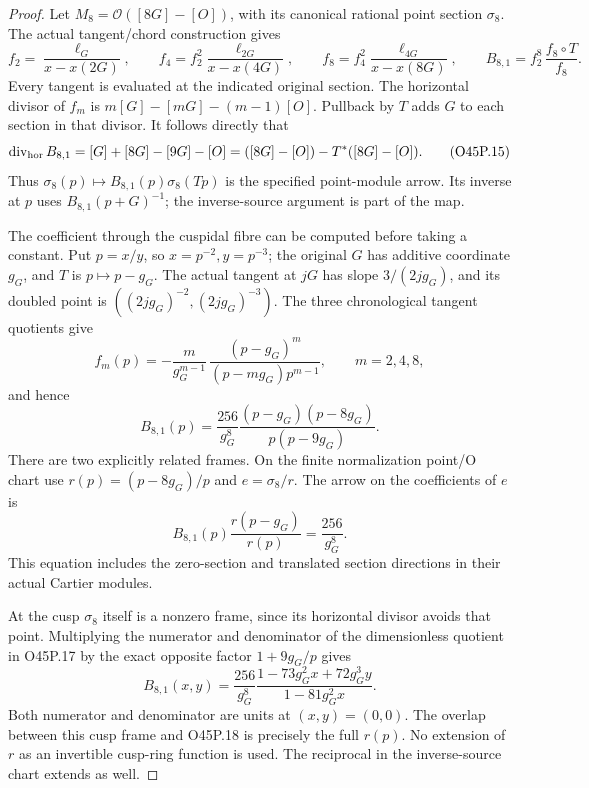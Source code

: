 \begin{proof}
\par\nobreak

Let \(M_8=\mathcal O([8G]-[O])\), with its canonical rational point
section \(\sigma_8\). The actual tangent/chord construction gives
\[
 f_2=\frac{\ell_G}{x-x(2G)},\qquad
 f_4=f_2^2\frac{\ell_{2G}}{x-x(4G)},\qquad
 f_8=f_4^2\frac{\ell_{4G}}{x-x(8G)},\qquad
 B_{8,1}=f_2^8\,\frac{f_8\circ T}{f_8}.
 \tag{O45P.14}
\]
Every tangent is evaluated at the indicated original section.
The horizontal divisor of \(f_m\) is
\(m[G]-[mG]-(m-1)[O]\). Pullback by \(T\) adds \(G\) to each
section in that divisor. It follows directly that
\[
 \operatorname{div}_{\rm hor}B_{8,1}
      =[G]+[8G]-[9G]-[O]
      =([8G]-[O])-T^*([8G]-[O]).
 \tag{O45P.15}
\]
Thus \(\sigma_8(p)\mapsto B_{8,1}(p)\sigma_8(Tp)\) is the
specified point-module arrow. Its inverse at \(p\) uses
\(B_{8,1}(p+G)^{-1}\); the inverse-source argument is part of the map.

The coefficient through the cuspidal fibre can be computed before
taking a constant. Put \(p=x/y\), so \(x=p^{-2},y=p^{-3}\);
the original \(G\) has additive coordinate \(g_G\), and \(T\) is
\(p\mapsto p-g_G\). The actual tangent at \(jG\) has slope
\(3/(2jg_G)\), and its doubled point is
\(((2jg_G)^{-2},(2jg_G)^{-3})\).
The three chronological tangent quotients give
\[
 f_m(p)=-\frac{m}{g_G^{m-1}}\,
       \frac{(p-g_G)^m}{(p-mg_G)p^{m-1}},
       \qquad m=2,4,8,
 \tag{O45P.16}
\]
and hence
\[
 B_{8,1}(p)=\frac{256}{g_G^8}
       \frac{(p-g_G)(p-8g_G)}{p(p-9g_G)}.
 \tag{O45P.17}
\]
There are two explicitly related frames. On the finite
normalization point/O chart use
\(r(p)=(p-8g_G)/p\) and \(e=\sigma_8/r\).
The arrow on the coefficients of \(e\) is
\[
 B_{8,1}(p)\frac{r(p-g_G)}{r(p)}
          =\frac{256}{g_G^8}.
 \tag{O45P.18}
\]
This equation includes the zero-section and translated section
directions in their actual Cartier modules.

At the cusp \(\sigma_8\) itself is a nonzero frame, since its
horizontal divisor avoids that point. Multiplying the numerator
and denominator of the dimensionless quotient in O45P.17 by
the exact opposite factor \(1+9g_G/p\) gives
\[
 B_{8,1}(x,y)=\frac{256}{g_G^8}
       \frac{1-73g_G^2x+72g_G^3y}{1-81g_G^2x}.
 \tag{O45P.19}
\]
Both numerator and denominator are units at \((x,y)=(0,0)\).
The overlap between this cusp frame and O45P.18 is precisely the
full \(r(p)\). No extension of \(r\) as an invertible cusp-ring
function is used. The reciprocal in the inverse-source chart
extends as well.


\end{proof}
